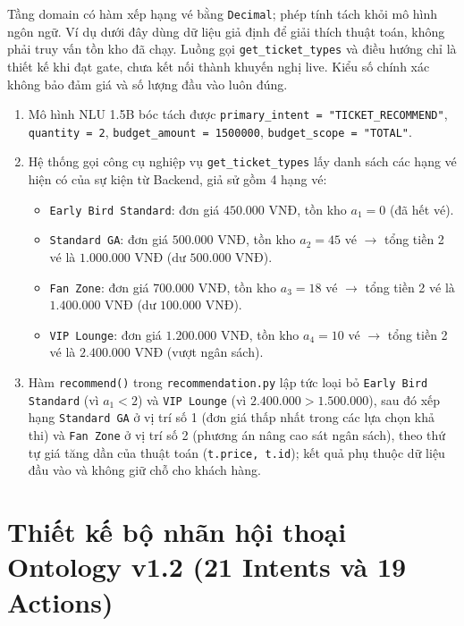Tầng domain có hàm xếp hạng vé bằng \texttt{Decimal}; phép tính tách khỏi mô hình ngôn ngữ. Ví dụ dưới đây dùng dữ liệu giả định để giải thích thuật toán, không phải truy vấn tồn kho đã chạy. Luồng gọi \texttt{get\_ticket\_types} và điều hướng chỉ là thiết kế khi đạt gate, chưa kết nối thành khuyến nghị live. Kiểu số chính xác không bảo đảm giá và số lượng đầu vào luôn đúng.
\begin{enumerate}[nosep]
  \item Mô hình NLU 1.5B bóc tách được \texttt{primary\_intent = "TICKET\_RECOMMEND"}, \texttt{quantity = 2}, \texttt{budget\_amount = 1500000}, \texttt{budget\_scope = "TOTAL"}.
  \item Hệ thống gọi công cụ nghiệp vụ \texttt{get\_ticket\_types} lấy danh sách các hạng vé hiện có của sự kiện từ Backend, giả sử gồm 4 hạng vé:
  \begin{itemize}[nosep]
    \item \texttt{Early Bird Standard}: đơn giá $450.000\text{ VNĐ}$, tồn kho $a_1 = 0$ (đã hết vé).
    \item \texttt{Standard GA}: đơn giá $500.000\text{ VNĐ}$, tồn kho $a_2 = 45$ vé $\rightarrow$ tổng tiền 2 vé là $1.000.000\text{ VNĐ}$ (dư $500.000\text{ VNĐ}$).
    \item \texttt{Fan Zone}: đơn giá $700.000\text{ VNĐ}$, tồn kho $a_3 = 18$ vé $\rightarrow$ tổng tiền 2 vé là $1.400.000\text{ VNĐ}$ (dư $100.000\text{ VNĐ}$).
    \item \texttt{VIP Lounge}: đơn giá $1.200.000\text{ VNĐ}$, tồn kho $a_4 = 10$ vé $\rightarrow$ tổng tiền 2 vé là $2.400.000\text{ VNĐ}$ (vượt ngân sách).
  \end{itemize}
  \item Hàm \texttt{recommend()} trong \texttt{recommendation.py} lập tức loại bỏ \texttt{Early Bird Standard} (vì $a_1 < 2$) và \texttt{VIP Lounge} (vì $2.400.000 > 1.500.000$), sau đó xếp hạng \texttt{Standard GA} ở vị trí số 1 (đơn giá thấp nhất trong các lựa chọn khả thi) và \texttt{Fan Zone} ở vị trí số 2 (phương án nâng cao sát ngân sách), theo thứ tự giá tăng dần của thuật toán (\texttt{t.price, t.id}); kết quả phụ thuộc dữ liệu đầu vào và không giữ chỗ cho khách hàng.
\end{enumerate}

\section{Thiết kế bộ nhãn hội thoại Ontology v1.2 (21 Intents và 19 Actions)}
\label{sec:dialogue_ontology}

